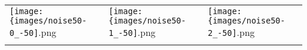  \begin{tabular}{lll}
\texttt{[image: \{images/noise50-0\_-50]}.png} &\texttt{[image: \{images/noise50-1\_-50]}.png} &\texttt{[image: \{images/noise50-2\_-50]}.png} 
 \\ \hfill\end{tabular}